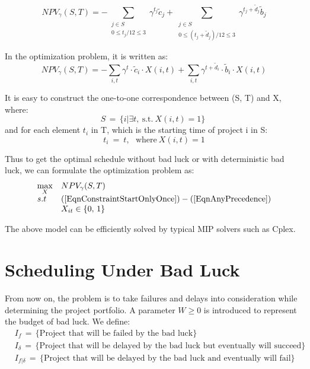 \documentclass[final,3p,times]{elsarticle}
\begin{document}
\begin{equation}
	NPV_{\gamma} ( S,T ) = - \sum\limits_{\substack{j \in S\\0 \leq t_j/12 \leq 3}} \gamma^{t_j} \tilde{c}_j + \sum\limits_{\substack{j \in S\\0 \leq (t_j+\tilde{d}_j)/12 \leq 3}} \gamma^{t_j+\tilde{d}_j} \tilde{b}_j
\end{equation}

In the optimization problem, it is written as:
\begin{equation}
	NPV_{\gamma} ( S,T ) = - \sum\limits_{i,t} \gamma^t \cdot \tilde{c}_i \cdot X(i,t) + \sum\limits_{i,t} \gamma^{t+\tilde{d}_i} \cdot \tilde{b}_i \cdot X(i,t)
\end{equation}

It is easy to construct the one-to-one correspondence between (S, T) and X, where:
\begin{equation}
	S\,=\,\{i | \exists t,~\mbox{s.t.}~X(i,t)=1\}\;
\end{equation}
and for each element $t_i$ in T, which is the starting time of project i in S:
\begin{equation}
	t_i~=~t ,~~~\mbox{where}~ X(i,t)=1
\end{equation}

Thus to get the optimal schedule without bad luck or with deterministic bad luck, we can formulate the optimization problem as:
\begin{equation}
	\begin{array}{ll}
		\max\limits_{X} &NPV_\gamma(S,T)\\
		s.t &(\ref{EqnConstraintStartOnlyOnce}) -(\ref{EqnAnyPrecedence})\\
		& X_{it} \in \{0,\,1\}
	\end{array}
\end{equation}

The above model can be efficiently solved by typical MIP solvers such as Cplex.

\section{Scheduling Under Bad Luck}
From now on, the problem is to take failures and delays into consideration while determining the project portfolio. A parameter $W\geq 0$ is introduced to represent the budget of bad luck. We define:
\begin{align*}
	&I_f\,=\, \{\mbox{Project that will be failed by the bad luck}\}\\
	&I_{\delta}\,=\, \{\mbox{Project that will be delayed by the bad luck but eventually will succeed}\}\\
	&I_{f|\delta}\,=\, \{\mbox{Project that will be delayed by the bad luck and eventually will fail}\}\\
\end{align*}
\end{document}
